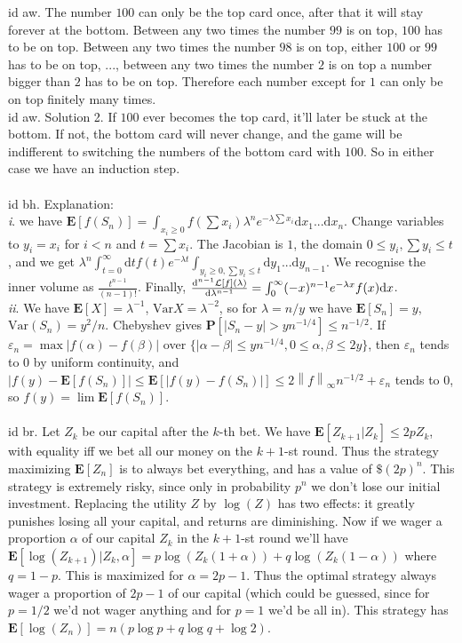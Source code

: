 \documentclass[oneside]{book}
\newcommand{\eps}{\varepsilon}
\renewcommand{\P}{\mathbf{P}}
\newcommand{\E}{\mathbf{E}}
\newcommand{\set}[1]{\{ #1\}}
\newcommand{\inv}{^{-1}}
\newcommand{\abs}[1]{\left\lvert #1\right\rvert}
\newcommand{\norm}[1]{\left\lVert #1\right\rVert}
\renewcommand{\d}{\mathrm{d}}
\newcommand{\var}{\mathrm{Var}}
\renewcommand{\i}{{\it i}. }
\newcommand{\ii}{{\it ii}. }
\begin{document}
id aw. The number $100$ can only be the top card once, after that it will stay forever at the bottom. Between any two times the number $99$ is on top, $100$ has to be on top. Between any two times the number $98$ is on top, either $100$ or $99$ has to be on top, ..., between any two times the number $2$ is on top a number bigger than $2$ has to be on top. Therefore each number except for $1$ can only be on top finitely many times.  \\

id aw. Solution 2. If $100$ ever becomes the top card, it'll later be stuck at the bottom. If not, the bottom card will never change, and the game will be indifferent to switching the numbers of the bottom card with $100$. So in either case we have an induction step. \\\\


id bh. Explanation: \\
\i we have $\E[f(S_n)]=\int_{x_i\ge0}f(\sum x_i)\lambda^n e^{-\lambda\sum x_i}\d x_1...\d x_n$. Change variables to $y_i=x_i$ for $i<n$ and $t=\sum x_i$. The Jacobian is $1$, the domain $0\le y_i, \sum y_i\le t$, and we get $\lambda^n\int_{t=0}^{\infty}\d t f(t)e^{-\lambda t} \int_{y_i\ge 0, \sum y_i\le t}\d y_1...\d y_{n-1} $. We recognise the inner volume as $\frac{t^{n-1}}{(n-1)!}$. Finally, $\frac{\d^{n-1} \LL[f](\lambda)}{\d \lambda^{n-1}}=\int_0^{\infty} (-x)^{n-1} e^{-\lambda x}f(x)\d x$.  \\
\ii We have $\E[X]=\lambda\inv$, $\var X=\lambda^{-2}$, so for $\lambda=n/y$ we have $\E[S_n]=y$, $\var(S_n)=y^2/n$. Chebyshev gives $\P[\abs{S_n-y}>yn^{-1/4}]\le n^{-1/2}$. If $\eps_n=\displaystyle\max\abs{f(\alpha)-f(\beta)}$ over $\set{\abs{\alpha-\beta}\le yn^{-1/4}, 0\le\alpha,\beta\le 2y}$, then $\eps_n$ tends to $0$ by uniform continuity, and $\abs{f(y)-\E[f(S_n)]}\le\E[\abs{f(y)-f(S_n)}]\le 2\norm{f}_\infty n^{-1/2} + \eps_n$ tends to $0$, so $f(y)=\lim\E[f(S_n)]$.   \\\\


id br. Let $Z_k$ be our capital after the $k$-th bet. We have $\E[Z_{k+1}|Z_k]\le 2pZ_k$, with equality iff we bet all our money on the $k+1$-st round. Thus the strategy maximizing $\E[Z_n]$ is to always bet everything, and has a value of $\$(2p)^n$. This strategy is extremely risky, since only in probability $p^n$ we don't lose our initial investment. Replacing the utility $Z$ by $\log(Z)$ has two effects: it greatly punishes losing all your capital, and returns are diminishing. Now if we wager a proportion $\alpha$ of our capital $Z_k$ in the $k+1$-st round we'll have $\E[\log(Z_{k+1})| Z_k,\alpha]=p\log(Z_k(1+\alpha)) + q\log(Z_k(1-\alpha))$ where $q=1-p$. This is maximized for $\alpha=2p-1$. Thus the optimal strategy always wager a proportion of $2p-1$ of our capital (which could be guessed, since for $p=1/2$ we'd not wager anything and for $p=1$ we'd be all in). This strategy has $\E[\log(Z_n)]=n(p\log p +q\log q+\log 2)$.   \\
\end{document}
